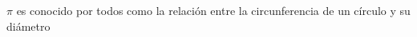 \documentclass[preview]{standalone}
\begin{document}
\begin{center}
\(\pi\) es conocido por todos como la relación entre la circunferencia de un círculo y su diámetro
\end{center}
\end{document}
